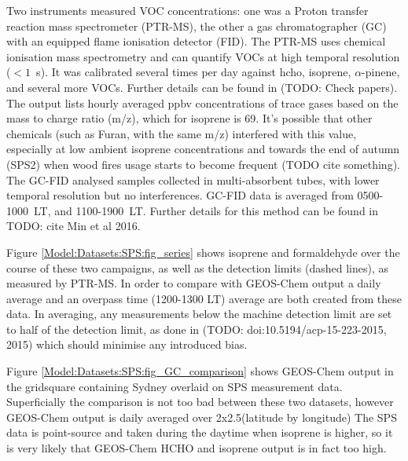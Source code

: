     Two instruments measured VOC concentrations: one was a Proton transfer reaction mass spectrometer (PTR-MS), the other a gas chromatographer (GC) with an equipped flame ionisation detector (FID).
    The PTR-MS uses chemical ionisation mass spectrometry and can quantify VOCs at high temporal resolution ($< 1$~s).
    It was calibrated several times per day against hcho, isoprene, $\alpha$-pinene, and several more VOCs. Further details can be found in \textcite{Dunne2012, Dunne2017} (TODO: Check papers).
    The output lists hourly averaged ppbv concentrations of trace gases based on the mass to charge ratio (m/z), which for isoprene is 69.
    It's possible that other chemicals (such as Furan, with the same m/z) interfered with this value, especially at low ambient isoprene concentrations and towards the end of autumn (SPS2) when wood fires usage starts to become frequent (TODO cite something).
    The GC-FID analysed samples collected in multi-absorbent tubes, with lower temporal resolution but no interferences. GC-FID data is averaged from 0500-1000~LT, and 1100-1900~LT. Further details for this method can be found in TODO: cite Min et al 2016.
    
    Figure \ref{Model:Datasets:SPS:fig_series} shows isoprene and formaldehyde over the course of these two campaigns, as well as the detection limits (dashed lines), as measured by PTR-MS. In order to compare with GEOS-Chem output a daily average and an overpass time (1200-1300 LT) average are both created from these data.
    In averaging, any measurements below the machine detection limit are set to half of the detection limit, as done in (TODO: doi:10.5194/acp-15-223-2015, 2015) which should minimise any introduced bias.
    
    
    Figure \ref{Model:Datasets:SPS:fig_GC_comparison} shows GEOS-Chem output in the gridsquare containing Sydney overlaid on SPS measurement data.
    Superficially the comparison is not too bad between these two datasets, however GEOS-Chem output is daily averaged over 2x2.5\degr (latitude by longitude)
    The SPS data is point-source and taken during the daytime when isoprene is higher, so it is very likely that GEOS-Chem HCHO and isoprene output is in fact too high.
    
  
